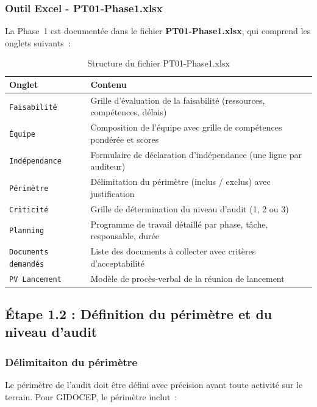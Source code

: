 \documentclass[12pt,a4paper,oneside]{report}
\begin{document}
\subsubsection{Outil Excel - PT01-Phase1.xlsx}

La Phase~1 est document\'ee dans le fichier \textbf{PT01-Phase1.xlsx}, qui
comprend les onglets suivants~:

\begin{table}[H]
\centering\small
\caption{Structure du fichier PT01-Phase1.xlsx}
\label{tab:pt01}
\begin{tabularx}{\textwidth}{p{3cm}X}
\toprule
\rowcolor{theadcolor}
\color{white}\textbf{Onglet} &
\color{white}\textbf{Contenu} \\
\midrule
\texttt{Faisabilité} & Grille d'évaluation de la faisabilité (ressources, compétences, délais) \\
\texttt{Équipe} & Composition de l'équipe avec grille de compétences pondérée et scores \\
\texttt{Indépendance} & Formulaire de déclaration d'indépendance (une ligne par auditeur) \\
\texttt{Périmètre} & Délimitation du périmètre (inclus / exclus) avec justification \\
\texttt{Criticité} & Grille de détermination du niveau d'audit (1, 2 ou 3) \\
\texttt{Planning} & Programme de travail détaillé par phase, tâche, responsable, durée \\
\texttt{Documents demandés} & Liste des documents à collecter avec critères d'acceptabilité \\
\texttt{PV Lancement} & Modèle de procès-verbal de la réunion de lancement \\
\bottomrule
\end{tabularx}
\end{table}

\subsection{\'Etape 1.2 : D\'efinition du p\'erim\`etre et du niveau d'audit}

\subsubsection{D\'elimitaiton du p\'erim\`etre}

Le p\'erim\`etre de l'audit doit \^etre d\'efini avec pr\'ecision avant toute
activit\'e sur le terrain. Pour GIDOCEP, le p\'erim\`etre inclut~:
\end{document}
